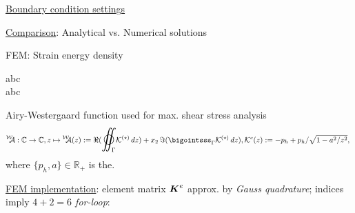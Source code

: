 \documentclass[25pt, a0paper,
portrait,
margin=2mm, 
innermargin=2mm, 
blockverticalspace=7mm, %
colspace=2mm, %
subcolspace=0mm]{tikzposter}
\makeatletter
\newcommand*{\inputfig}[3][htb]{{
    \def\fps@figure{#1}
    \def\DIR{#2}
    \def\LABEL{#3}
    \graphicspath{{\DIR/}}
    
}}
\newcommand{\WA}{\prescript{\mathcal{W}}{}{\!\!\!\mathcal{A}}}
\newcommand{\WAz}{\prescript{\mathcal{W}}{}{\!\!\!\mathcal{A}}(z)}
\newcommand{\mbR}{\mathbb{R}}
\newcommand{\mbC}{\mathbb{C}}
\newcommand{\mcK}{\mathcal{K}}
\newcommand{\bigoiintsss}{\mathlarger{\mathlarger{\varoiint}}}
\newcommand{\Kipc}{\mathcal{K}^{c}}
\newcommand{\Kipcz}{\mathcal{K}^{c}(z)}
\makeatother
\begin{document}
{\begin{minipage}{0.54\textwidth}
\begin{minipage}{0.7\textwidth}
			\begin{mdframed}
				\underline{Boundary condition settings}
				\begin{center}
					\inputfig{floats/structuraltwofields}{structuraltwofields}
				\end{center}
			\end{mdframed}
			\begin{mdframed}
				\begin{center}
					\inputfig{floats/routine_woTV_numa_one}{routine_woTV_numa_one}
				\end{center}
				\underline{Comparison}: Analytical vs. Numerical solutions
				\begin{center}
					\inputfig{floats/comparison_ana_numa}{comparison_ana_numa}
				\end{center}
			\end{mdframed}
		\end{minipage}
		\hfill 
		\begin{minipage}{0.3\textwidth}
			\begin{mdframed}
				FEM: Strain energy density
				\vspace{0.1cm}
				\inputfig{floats/griffith_flowchart_circle_formula}{griffith_flowchart_circle_formula}
				abc\\
				abc
			\end{mdframed}
		\end{minipage}
		\begin{mdframed}
			Airy-Westergaard function used for max. shear stress analysis
			\begin{align*}
				\WA:
				\mbC\to\mbC,
				z \mapsto \WAz:=
				\Re(\bigoiintsss_{\Gamma} \mcK^{(\star)}\,dz )
				+ x_2\,
				\Im(\bigointsss_{\Gamma} \mcK^{(\star)}\,dz ),
				\Kipcz:=
				- p_{h} + p_{h}/\sqrt{1 - a^2/z^2},\
			\end{align*}
			where $\{p_{h},a\}\in\mbR_{+}$ is the.
		\end{mdframed}
		\begin{mdframed}
			\underline{FEM implementation}:
			element matrix ${\boldsymbol{\mathnormal K}}^{e}$
			approx. by \textit{Gauss quadrature}; 
			indices imply \textit{$4+2=6$ \textit{for}-loop}:
			\begin{align*}

\end{align*}
\end{mdframed}
\end{minipage}}
\end{document}
